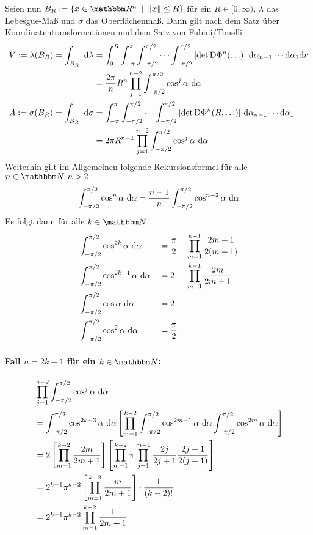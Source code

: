 	Seien nun $B_R := \set{ x \in \SR^n }{ \norm{x} \leq R }$ für ein $R\in[0,\infty)$, $\lambda$ das Lebesgue-Maß und $\sigma$ das Oberflächenmaß.
	Dann gilt nach dem Satz über Koordinatentransformationen und dem Satz von Fubini/Tonelli
	\begin{alignat}{2}
		V := \lambda(B_R) = \int_{B_R}^{} \ \mathrm{d} \lambda &= \int_0^R \int_{-\pi}^\pi \int_{-\pi/2}^{\pi/2}\cdots\int_{-\pi/2}^{\pi/2} \left\vert  \det\mathrm{D}\Phi^{n}(\ldots)  \right\vert \, \mathrm{d}\alpha_{n-1}\cdots\mathrm{d}\alpha_1\mathrm{d} r \nonumber \\
		&= \dfrac{2\pi}{n}R^n \prod_{j=1}^{n-2} \int_{-\pi/2}^{\pi/2} \cos^j\alpha\ \mathrm{d} \alpha \nonumber \\
		A := \sigma(B_R) = \int_{B_R}^{} \ \mathrm{d} \sigma &= \int_{-\pi}^\pi \int_{-\pi/2}^{\pi/2}\cdots\int_{-\pi/2}^{\pi/2} \left\vert  \det\mathrm{D}\Phi^{n}(R,\ldots)  \right\vert \, \mathrm{d}\alpha_{n-1}\cdots\mathrm{d}\alpha_1 \nonumber \\
		&= 2\pi R^{n-1} \prod_{j=1}^{n-2} \int_{-\pi/2}^{\pi/2} \cos^j\alpha\ \mathrm{d} \alpha \nonumber
	\end{alignat}
	Weiterhin gilt im Allgemeinen folgende Rekursionsformel für alle $n\in\SN, n>2$
	\[ \int_{-\pi/2}^{\pi/2} \cos^n\alpha\ \mathrm{d} \alpha = \dfrac{n-1}{n} \int_{-\pi/2}^{\pi/2} \cos^{n-2}\alpha\ \mathrm{d} \alpha \]
	Es folgt dann für alle $k\in\SN$
	\begin{alignat}{3}
		&\int_{-\pi/2}^{\pi/2} \cos^{2k}\alpha\ \mathrm{d} \alpha &&= \dfrac{\pi}{2} &&\prod_{m=1}^{k-1} \dfrac{2m+1}{2(m+1)} \nonumber \\
		&\int_{-\pi/2}^{\pi/2} \cos^{2k-1}\alpha\ \mathrm{d} \alpha &&= 2 &&\prod_{m=1}^{k-1} \dfrac{2m}{2m+1} \nonumber \\
		&\int_{-\pi/2}^{\pi/2} \cos\alpha\ \mathrm{d} \alpha &&= 2 \nonumber \\
		&\int_{-\pi/2}^{\pi/2} \cos^{2}\alpha\ \mathrm{d} \alpha &&= \dfrac{\pi}{2} \nonumber
	\end{alignat}

	\paragraph{Fall $n=2k-1$ für ein $k\in\SN$:}
	\begin{alignat}{2}
		&\prod_{j=1}^{n-2} \int_{-\pi/2}^{\pi/2} \cos^j\alpha\ \mathrm{d} \alpha \nonumber \\
		&= \int_{-\pi/2}^{\pi/2} \cos^{2k-3}\alpha\ \mathrm{d} \alpha \left[  \prod_{m=1}^{k-2} \int_{-\pi/2}^{\pi/2} \cos^{2m-1}\alpha\ \mathrm{d} \alpha \int_{-\pi/2}^{\pi/2} \cos^{2m}\alpha\ \mathrm{d} \alpha  \right] \nonumber \\ 
		&= 2 \left[  \prod_{m=1}^{k-2} \dfrac{2m}{2m+1}  \right] \left[  \prod_{m=1}^{k-2} \pi \prod_{j=1}^{m-1} \dfrac{2j}{2j+1}\dfrac{2j+1}{2(j+1)}  \right] \nonumber \\
		&= 2^{k-1}\pi^{k-2} \left[  \prod_{m=1}^{k-2} \dfrac{m}{2m+1}  \right] \cdot \dfrac{1}{(k-2)!} \nonumber \\
		&= 2^{k-1}\pi^{k-2} \prod_{m=1}^{k-2} \dfrac{1}{2m+1} \nonumber
	\end{alignat}

